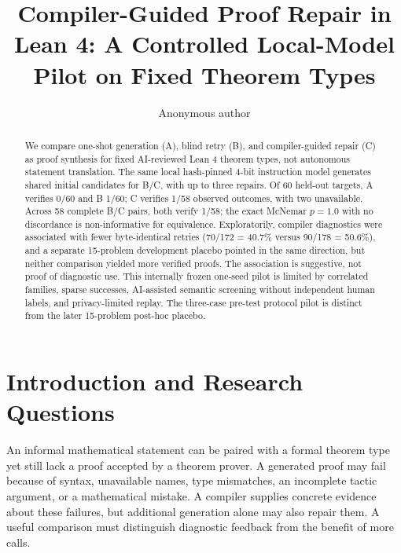 \documentclass[runningheads,a4paper]{llncs}
\begin{document}
\title{Compiler-Guided Proof Repair in Lean 4: A Controlled Local-Model Pilot on Fixed Theorem Types}
\author{Anonymous author}
\maketitle

\begin{abstract}
We compare one-shot generation (A), blind retry (B), and compiler-guided
repair (C) as proof synthesis for fixed AI-reviewed Lean 4 theorem types,
not autonomous statement translation. The same local hash-pinned 4-bit
instruction model generates shared initial candidates for B/C, with up to
three repairs. Of 60 held-out targets, A verifies 0/60 and B 1/60; C verifies
1/58 observed outcomes, with two unavailable. Across 58 complete B/C pairs,
both verify 1/58; the exact McNemar $p=1.0$ with no discordance is
non-informative for equivalence. Exploratorily, compiler diagnostics were
associated with fewer byte-identical retries (70/172 = 40.7\% versus
90/178 = 50.6\%), and a separate 15-problem development placebo pointed
in the same direction, but neither comparison yielded more verified proofs.
The association is suggestive, not proof of diagnostic use. This internally
frozen one-seed pilot is limited by correlated families, sparse successes,
AI-assisted semantic screening without independent human labels, and
privacy-limited replay. The three-case pre-test protocol pilot is distinct
from the later 15-problem post-hoc placebo.
\end{abstract}

\section{Introduction and Research Questions}
An informal mathematical statement can be paired with a formal theorem type
yet still lack a proof accepted by a theorem prover. A generated proof may fail
because of syntax, unavailable names, type mismatches, an incomplete tactic
argument, or a mathematical mistake. A compiler supplies concrete evidence about
these failures, but additional generation alone may also repair them. A useful
comparison must distinguish diagnostic feedback from the benefit of more calls.
\end{document}
